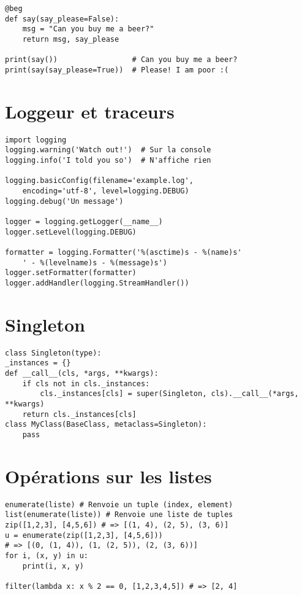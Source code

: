 \documentclass{article}
\begin{document}
\begin{multicols*}{4}
\begin{lstlisting}
@beg
def say(say_please=False):
    msg = "Can you buy me a beer?"
    return msg, say_please

print(say())                 # Can you buy me a beer?
print(say(say_please=True))  # Please! I am poor :(
\end{lstlisting}

\section*{Loggeur et traceurs}
\begin{lstlisting}
import logging
logging.warning('Watch out!')  # Sur la console
logging.info('I told you so')  # N'affiche rien

logging.basicConfig(filename='example.log',
    encoding='utf-8', level=logging.DEBUG)
logging.debug('Un message')

logger = logging.getLogger(__name__)
logger.setLevel(logging.DEBUG)

formatter = logging.Formatter('%(asctime)s - %(name)s'
    ' - %(levelname)s - %(message)s')
logger.setFormatter(formatter)
logger.addHandler(logging.StreamHandler())

\end{lstlisting}

\section*{Singleton}
\begin{lstlisting}
class Singleton(type):
_instances = {}
def __call__(cls, *args, **kwargs):
    if cls not in cls._instances:
        cls._instances[cls] = super(Singleton, cls).__call__(*args, **kwargs)
    return cls._instances[cls]
class MyClass(BaseClass, metaclass=Singleton):
    pass
\end{lstlisting}

\section*{Opérations sur les listes}
\begin{lstlisting}
enumerate(liste) # Renvoie un tuple (index, element)
list(enumerate(liste)) # Renvoie une liste de tuples
zip([1,2,3], [4,5,6]) # => [(1, 4), (2, 5), (3, 6)]
u = enumerate(zip([1,2,3], [4,5,6]))
# => [(0, (1, 4)), (1, (2, 5)), (2, (3, 6))]
for i, (x, y) in u:
    print(i, x, y)

filter(lambda x: x % 2 == 0, [1,2,3,4,5]) # => [2, 4]
\end{lstlisting}


\end{multicols*}
\end{document}
